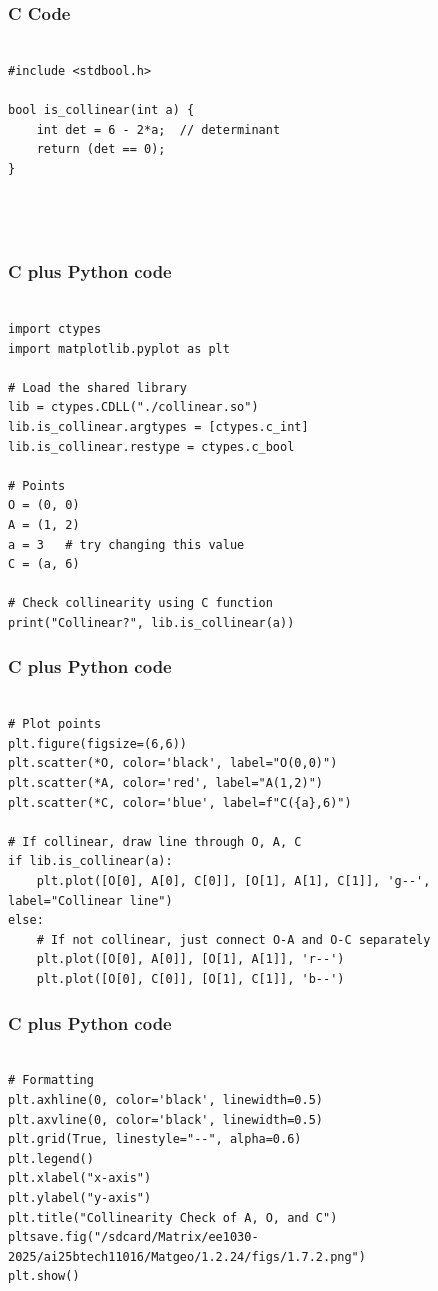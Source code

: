 \documentclass{beamer}
\begin{document}
\begin{frame}[fragile]
    \frametitle{C Code}
    \begin{lstlisting}

#include <stdbool.h>

bool is_collinear(int a) {
    int det = 6 - 2*a;  // determinant
    return (det == 0);
}




\end{lstlisting}
 
\end{frame}
\begin{frame}[fragile]
    \frametitle{C plus Python code}
    \begin{lstlisting}

import ctypes
import matplotlib.pyplot as plt

# Load the shared library
lib = ctypes.CDLL("./collinear.so")
lib.is_collinear.argtypes = [ctypes.c_int]
lib.is_collinear.restype = ctypes.c_bool

# Points
O = (0, 0)
A = (1, 2)
a = 3   # try changing this value
C = (a, 6)

# Check collinearity using C function
print("Collinear?", lib.is_collinear(a))
\end{lstlisting}
 
\end{frame}
\begin{frame}[fragile]
    \frametitle{C plus Python code}
    \begin{lstlisting}

# Plot points
plt.figure(figsize=(6,6))
plt.scatter(*O, color='black', label="O(0,0)")
plt.scatter(*A, color='red', label="A(1,2)")
plt.scatter(*C, color='blue', label=f"C({a},6)")

# If collinear, draw line through O, A, C
if lib.is_collinear(a):
    plt.plot([O[0], A[0], C[0]], [O[1], A[1], C[1]], 'g--', label="Collinear line")
else:
    # If not collinear, just connect O-A and O-C separately
    plt.plot([O[0], A[0]], [O[1], A[1]], 'r--')
    plt.plot([O[0], C[0]], [O[1], C[1]], 'b--')
\end{lstlisting}
 
\end{frame}
\begin{frame}[fragile]
    \frametitle{C plus Python code}
    \begin{lstlisting}

# Formatting
plt.axhline(0, color='black', linewidth=0.5)
plt.axvline(0, color='black', linewidth=0.5)
plt.grid(True, linestyle="--", alpha=0.6)
plt.legend()
plt.xlabel("x-axis")
plt.ylabel("y-axis")
plt.title("Collinearity Check of A, O, and C")
pltsave.fig("/sdcard/Matrix/ee1030-2025/ai25btech11016/Matgeo/1.2.24/figs/1.7.2.png")
plt.show()
\end{lstlisting}
 
\end{frame}
\end{document}
